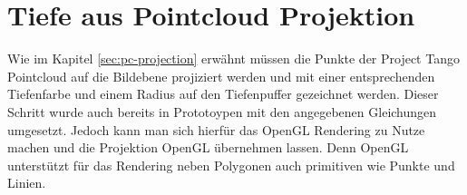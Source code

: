 \section{Tiefe aus Pointcloud Projektion}

Wie im Kapitel \ref{sec:pc-projection} erwähnt müssen die Punkte der Project Tango Pointcloud auf die Bildebene projiziert werden und mit einer entsprechenden Tiefenfarbe und einem Radius auf den Tiefenpuffer gezeichnet werden. Dieser Schritt wurde auch bereits in Prototoypen mit den angegebenen Gleichungen umgesetzt. Jedoch kann man sich hierfür das OpenGL Rendering zu Nutze machen und die Projektion OpenGL übernehmen lassen. Denn OpenGL unterstützt für das Rendering neben Polygonen auch primitiven wie Punkte und Linien. 


